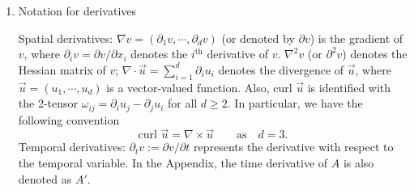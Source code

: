 \documentclass[13pt,CJK]{article}
\theoremstyle{plain}                       %
\theoremstyle{remark}
\numberwithin{equation}{section}
\begin{document}
\begin{enumerate}
\begin{itemize}
  \item Let $F:=f-\nabla p_0$ be given with $p_0$ satisfying \eqref{pde1.2}, and
$G:=S_{\delta}(\varphi_{\varepsilon}F)$ with $\delta=\frac{\varepsilon}{4}$,
where $S_{\delta}$ is a smoothing operator\footnote{
Fix a nonnegative function $\zeta\in C_0^\infty(B(0,1/2))$ with
$\int dx\zeta(x) = 1$. For any $f\in L^p(\mathbb{R}^d)$ with $1\leq p<\infty$, we define the smoothing operator as
$S_\delta(f)(x):=\int dy f(x-y)\zeta_\delta(y)$,
where $\zeta_\delta(y)=\delta^{-d}
\zeta(y/\delta)$.
}, and $\varphi_{\varepsilon}$ is a general cut-off function defined above.
  \item Let $\phi^{\varepsilon}(x,t):=\phi(\frac{x}{\varepsilon},t)$,
$W^{\varepsilon}(x,t):=W(\frac{x}{\varepsilon},t)$, and
$\pi^\varepsilon(x,t):=\pi(\frac{x}{\varepsilon},t)$,
in which correctors $(W,\pi)$ and $\phi$ are defined in
the equations $\eqref{pde2.1}$ and $\eqref{divc1*}$, respectively;
We also introduce two important quantities:
\begin{equation}\label{pde3.8}
  \begin{aligned}
  J_1&:=\nabla \psi_{\varepsilon}\cdot\big[(W^{\varepsilon}-A)\ast G\big];\\
  J_2&:=\nabla \psi_{\varepsilon}\cdot (A\ast G)
  +\varepsilon\nabla \psi_{\varepsilon}\cdot
  \big(\phi^{\varepsilon}
  \ast_{2} \partial G\big)
  +\psi_{\varepsilon}\frac{A}{|Y_f|}\ast_{2} \partial G
  +\varepsilon\psi_{\varepsilon}\phi^{\varepsilon}
  \ast_{3} \partial^2 G.
  \end{aligned}
\end{equation}
(We recommend that readers initially skip the derivation of the
above expression and treat it merely as a notation. After reviewing Subsection $\ref{subsec:1.2}$ and Remark $\ref{remark:3.1}$, readers will naturally encounter the source of the expression at the beginning of Section $\ref{sec4}$.)
\end{itemize}

\item Notation for derivatives

Spatial derivatives:
  $\nabla v = (\partial_1 v, \cdots, \partial_d v)$ (or denoted by $\partial v$) is the gradient of $v$, where
  $\partial_i v = \partial v /\partial x_i$ denotes the
  $i^{\text{th}}$ derivative of $v$.
  $\nabla^2 v$ (or $\partial^2 v$)  denotes the Hessian matrix of $v$;
  $\nabla\cdot \vec{u}=\sum_{i=1}^d \partial_i u_i$
  denotes the divergence of $\vec{u}$, where
  $\vec{u} = (u_1,\cdots,u_d)$ is a vector-valued function.
Also, $\text{curl~}\vec{u}$ is identified with the 2-tensor
$\omega_{ij}=\partial_iu_j-\partial_j u_i$ for all $d\geq 2$. In particular, we have the following convention
\begin{equation*}
  \text{curl~}\vec{u}=\nabla\times \vec{u} \qquad \text{as}\quad d=3.
\end{equation*}
Temporal  derivatives: $\partial_t v:= \partial v/\partial t$ represents
the derivative with respect to the temporal variable. 
In the Appendix, the time derivative of $A$ is also denoted as 
$A'$.


\end{enumerate}
\end{document}

